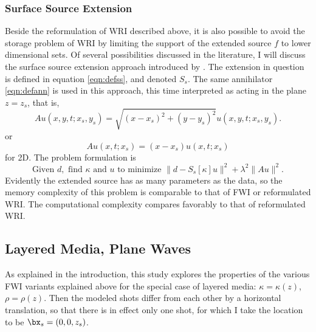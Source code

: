\subsubsection{Surface Source Extension}
Beside the reformulation of WRI described above, it is also possible
to avoid the storage problem of WRI by limiting the support of the
extended source $f$ to lower dimensional sets. Of several
possibilities discussed in the literature, I will discuss the 
  surface source extension approach introduced by
\cite{HuangNammourSymesDollizal:SEG19}. The extension in question is
defined in equation \ref{eqn:defss}, and denoted $S_s$. The same
annihilator \ref{eqn:defann} is used in this approach, this time
interpreted as acting in the plane $z=z_s$, that is,
\[
  Au(x,y,t;x_s,y_s) = \sqrt{(x-x_s)^2+(y-y_s)^2}u(x,y,t;x_s,y_s).
\]
or
\[
  Au(x,t;x_s) = (x-x_s)u(x,t;x_s)
\]
for 2D. 
The problem formulation is
\begin{equation}
  \label{eqn:defsse}
  \mbox{Given } d, \mbox{ find }\kappa \mbox{ and }u \mbox{ to
    minimize }
  \| d -  S_s[\kappa]u\|^2+\lambda^2\|Au\|^2.
\end{equation}
Evidently the extended source has as many parameters as the data, so
the memory complexity of this problem is comparable to that of FWI or
reformulated WRI. The computational complexity compares favorably to
that of reformulated WRI.

\subsection{Layered Media, Plane Waves}
As explained in the introduction, this study explores the properties
of the various FWI variants explained above for the special case of
layered media: $\kappa = \kappa(z)$,
$\rho=\rho(z)$. Then the modeled shots differ from
each other by a horizontal translation, so that there is in effect
only one shot, for which I take the location to be
$\bx_s=(0,0,z_s)$.

